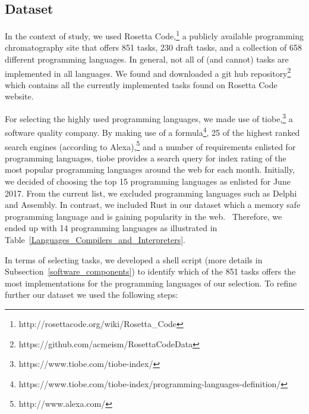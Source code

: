 \subsection{Dataset}
In the context of study, we used Rosetta 
Code,\footnote{http://rosettacode.org/wiki/Rosetta\_Code} a 
publicly available programming chromatography site that offers 
851 tasks, 230 draft tasks, and a collection of 658 different 
programming languages. In general, not all of (and cannot) tasks 
are implemented in all languages. 
We found and downloaded a git hub repository\footnote{https://github.com/acmeism/RosettaCodeData} 
which contains all the currently implemented tasks found on 
Rosetta Code website.

For selecting the highly used programming languages, we made use 
of tiobe,\footnote{https://www.tiobe.com/tiobe-index/} a software 
quality company.
By making use of a formula\footnote{https://www.tiobe.com/tiobe-index/programming-languages-definition/}, 
25 of the highest ranked search engines (according to Alexa),\footnote{http://www.alexa.com/} 
and a number of requirements enlisted for programming languages, 
tiobe provides a search query for index rating of the most popular 
programming languages around the web for each month. 
Initially, we decided of choosing the top 15 programming languages 
as enlisted for June 2017. 
From the current list, we excluded programming languages such as 
Delphi and Assembly. 
In contrast, we included Rust in our dataset which a memory safe 
programming language and is gaining popularity in the web. \
Therefore, we ended up with 14 programming languages as illustrated 
in Table~\ref{Languages_Compilers_and_Interpreters}.

In terms of selecting tasks, we developed a shell script (more 
details in Subsection~\ref{software_components}) to identify 
which of the 851 tasks offers the most implementations for the 
programming languages of our selection. 
To refine further our dataset we used the following steps: 

